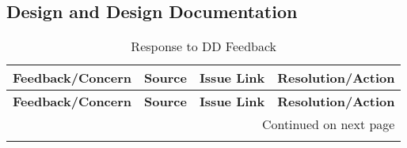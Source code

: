 \documentclass{article}
\begin{document}
\subsection{Design and Design Documentation}
\begin{longtable}{|p{5cm}|p{1.5cm}|p{2cm}|p{5cm}|}
\caption{Response to DD Feedback} \\
\hline
\textbf{Feedback/Concern} & \textbf{Source} & \textbf{Issue Link} & \textbf{Resolution/Action} \\ \hline
\endfirsthead
\hline
\textbf{Feedback/Concern} & \textbf{Source} & \textbf{Issue Link} & \textbf{Resolution/Action} \\ \hline
\endhead
\hline \multicolumn{4}{r}{{Continued on next page}} \\ \hline
\endfoot
\hline
\endlastfoot


\end{longtable}
\end{document}
